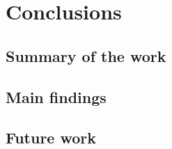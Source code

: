 %
%
%
\chapter{Conclusions}
\label{ch:conclusions}

\section{Summary of the work}
\label{sec:summary}

\section{Main findings}
\label{sec:findings}

\section{Future work}
\label{sec:future-work}
